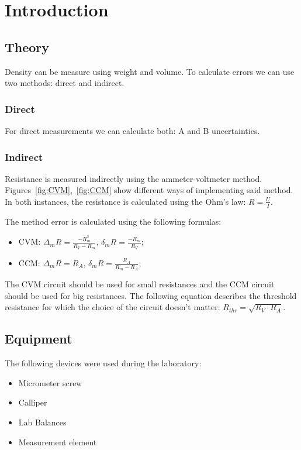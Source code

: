 \section{Introduction}

\subsection{Theory}
 
Density can be measure using weight and volume. To calculate errors we can use two methods: direct and indirect.
\subsubsection*{Direct}

For direct measurements we can calculate both: A and B uncertainties.



\subsubsection*{Indirect}

Resistance is measured indirectly using the ammeter-voltmeter method. Figures~\ref{fig:CVM},~\ref{fig:CCM} show different ways of implementing said method. In both instances, the resistance is calculated using the Ohm's law: $R=\frac{U}{I}$.  



The method error is calculated using the following formulas:
\begin{itemize}
	\item CVM: $\Delta_m R = \frac{-R_m^2}{R_V - R_m}$, $\delta_m R = \frac{-R_m}{R_V}$;
	\item CCM: $\Delta_m R = R_A$, $\delta_m R = \frac{R_A}{R_m - R_A}$;
\end{itemize}

The CVM circuit should be used for small resistances and the CCM circuit should be used for big resistances. The following equation describes the threshold resistance for which the choice of the circuit doesn't matter: $R_{thr} = \sqrt{R_V\cdot R_A}$.


\subsection{Equipment}

The following devices were used during the laboratory:

\begin{itemize}
	\item Micrometer screw
	\item Calliper
	\item Lab Balances
	\item Measurement element
\end{itemize}